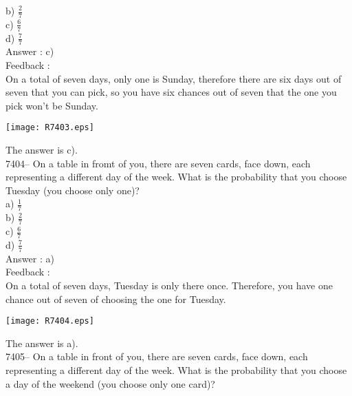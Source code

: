 \documentclass[letterpaper, 12pt]{article}
\begin{document}
b) $\frac{2}{7}$\\

c) $\frac{6}{7}$\\

d) $\frac{7}{7}$\\

Answer : c)\\

Feedback :\\
On a total of seven days, only one is Sunday, therefore there are six days out of seven that you can pick, so you have six chances out of seven that the one you pick won't be Sunday. \\

\begin{center}
\texttt{[image: R7403.eps]}
\end{center}

The answer is c).\\

7404-- On a table in fromt of you, there are seven cards, face down, each representing a different day of the week. What is the probability that you choose Tuesday (you choose only one)?\\

a) $\frac{1}{7}$\\

b) $\frac{2}{7}$\\

c) $\frac{6}{7}$\\

d) $\frac{7}{7}$\\

Answer : a)\\

Feedback :\\
On a total of seven days, Tuesday is only there once. Therefore, you have one chance out of seven of choosing the one for  \og Tuesday. \fg \\
\begin{center}
\texttt{[image: R7404.eps]}
\end{center}

The answer is a).\\

7405-- On a table in front of you, there are seven cards, face down, each representing a different day of the week. What is the probability that you choose a day of the weekend (you choose only one card)?\\
\end{document}
